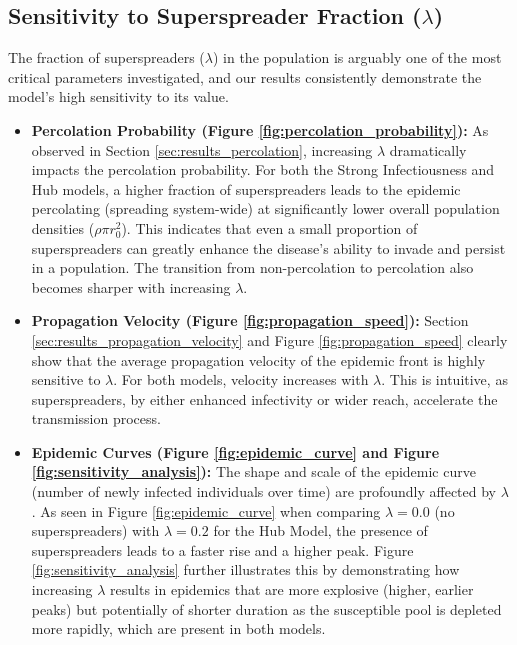 \documentclass{article}
\begin{document}
\subsection{Sensitivity to Superspreader Fraction ($\lambda$)}
\label{sec:sensitivity_lambda}

The fraction of superspreaders ($\lambda$) in the population is arguably one of the most critical parameters investigated, and our results consistently demonstrate the model's high sensitivity to its value.

\begin{itemize}
    \item \textbf{Percolation Probability (Figure \ref{fig:percolation_probability}):} 
    As observed in Section \ref{sec:results_percolation}, increasing $\lambda$ dramatically impacts the percolation probability. For both the Strong Infectiousness and Hub models, a higher fraction of superspreaders leads to the epidemic percolating (spreading system-wide) at significantly lower overall population densities ($\rho\pi r_0^2$). This indicates that even a small proportion of superspreaders can greatly enhance the disease's ability to invade and persist in a population. The transition from non-percolation to percolation also becomes sharper with increasing $\lambda$.

    \item \textbf{Propagation Velocity (Figure \ref{fig:propagation_speed}):}
    Section \ref{sec:results_propagation_velocity} and Figure \ref{fig:propagation_speed} clearly show that the average propagation velocity of the epidemic front is highly sensitive to $\lambda$. For both models, velocity increases with $\lambda$. This is intuitive, as superspreaders, by either enhanced infectivity or wider reach, accelerate the transmission process.

    \item \textbf{Epidemic Curves (Figure \ref{fig:epidemic_curve} and Figure \ref{fig:sensitivity_analysis}):}
    The shape and scale of the epidemic curve (number of newly infected individuals over time) are profoundly affected by $\lambda$. As seen in Figure \ref{fig:epidemic_curve} when comparing $\lambda=0.0$ (no superspreaders) with $\lambda=0.2$ for the Hub Model, the presence of superspreaders leads to a faster rise and a higher peak. Figure \ref{fig:sensitivity_analysis} further illustrates this by demonstrating how increasing $\lambda$ results in epidemics that are more explosive (higher, earlier peaks) but potentially of shorter duration as the susceptible pool is depleted more rapidly, which are present in both models.
\end{itemize}
\end{document}

